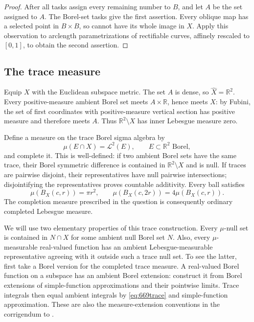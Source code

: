 \documentclass[11pt,a4paper]{article}
\theoremstyle{remark}
\begin{document}
\begin{proof}
After all tasks assign every remaining number to $B$, and let $A$ be the
set assigned to $A$.  The Borel-set tasks give the first assertion.  Every
oblique map has a selected point in $B\times B$, so cannot have its whole
image in $X$.  Apply this observation to arclength parametrizations of
rectifiable curves, affinely rescaled to $[0,1]$, to obtain the second
assertion.
\end{proof}

\subsection{The trace measure}

Equip $X$ with the Euclidean subspace metric.  The set $A$ is dense, so
$\widehat X=\mathbb R^2$.  Every positive-measure ambient Borel set meets
$A\times\mathbb R$, hence meets $X$: by Fubini, the set of first
coordinates with positive-measure vertical section has positive measure
and therefore meets $A$.  Thus $\mathbb R^2\setminus X$ has inner
Lebesgue measure zero.

Define a measure on the trace Borel sigma algebra by
\begin{equation}
 \mu(E\cap X)=\mathcal L^2(E),\qquad E\subset\mathbb R^2\text{ Borel},
 \label{eq:669trace}
\end{equation}
and complete it.  This is well-defined: if two ambient Borel sets have the
same trace, their Borel symmetric difference is contained in
$\mathbb R^2\setminus X$ and is null.  If traces are pairwise disjoint,
their representatives have null pairwise intersections; disjointifying
the representatives proves countable additivity.  Every ball satisfies
\[
 \mu(B_X(c,r))=\pi r^2,
 \qquad \mu(B_X(c,2r))=4\mu(B_X(c,r)).
\]
The completion measure prescribed in the question is consequently
ordinary completed Lebesgue measure.

We will use two elementary properties of this trace construction.  Every
$\mu$-null set is contained in $N\cap X$ for some ambient null Borel set
$N$.  Also, every $\mu$-measurable real-valued function has an ambient
Lebesgue-measurable representative agreeing with it outside such a trace
null set.  To see the latter, first take a Borel version for the completed
trace measure.  A real-valued Borel function on a subspace has an ambient
Borel extension: construct it from Borel extensions of simple-function
approximations and their pointwise limits.  Trace integrals then equal
ambient integrals by \eqref{eq:669trace} and simple-function approximation.
These are also the measure-extension conventions in the corrigendum to
\cite{BjornBjorn}.
\end{document}

